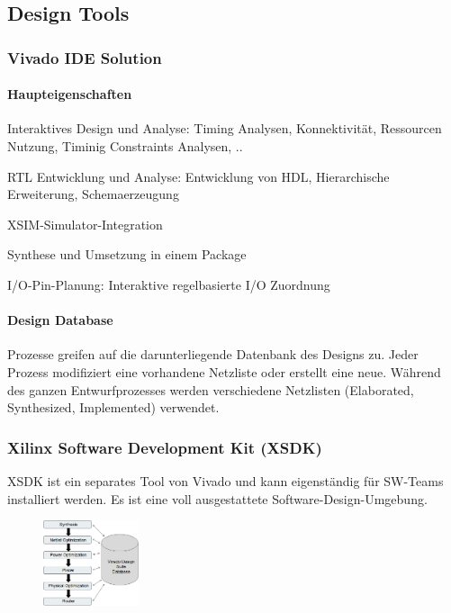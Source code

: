  \subsection{Design Tools}
 \subsubsection{Vivado IDE Solution}
 \paragraph{Haupteigenschaften}
 \begin{compactitem}
     \item Interaktives Design und Analyse: Timing Analysen, Konnektivität, Ressourcen Nutzung, Timinig Constraints Analysen, ..
     \item RTL Entwicklung und Analyse: Entwicklung von HDL, Hierarchische Erweiterung, Schemaerzeugung
     \item XSIM-Simulator-Integration
     \item Synthese und Umsetzung in einem Package
     \item I/O-Pin-Planung: Interaktive regelbasierte I/O Zuordnung
 \end{compactitem}
 \begin{multicols}{2}
     \paragraph{Design Database}
     Prozesse greifen auf die darunterliegende Datenbank des Designs zu. Jeder Prozess modifiziert eine vorhandene Netzliste oder erstellt eine neue. Während des ganzen Entwurfprozesses werden verschiedene Netzlisten (Elaborated, Synthesized, Implemented) verwendet.
     \subsubsection{Xilinx Software Development Kit (XSDK)}
    XSDK ist ein separates Tool von Vivado und kann eigenständig für SW-Teams installiert werden. Es ist eine voll ausgestattete Software-Design-Umgebung.
     \begin{figure}[H]
     	\includegraphics[width=0.25\textwidth]{images/Design_Database.png}
     \end{figure}
 \end{multicols}
